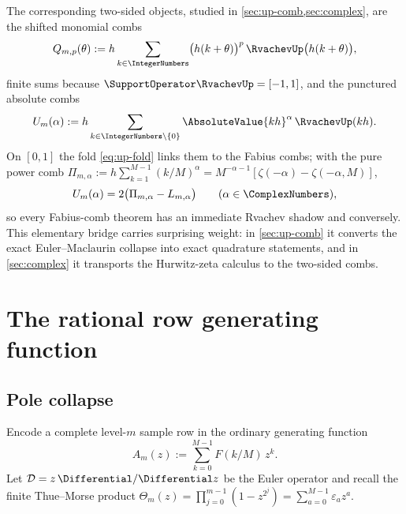 \documentclass[11pt,oneside]{article}
\numberwithin{equation}{section}
\theoremstyle{definition}
\theoremstyle{remark}
\newcommand{\eps}{\varepsilon}
\newcommand{\Dop}{\mathcal D}
\newcommand{\ThetaTM}{\Theta}
\begin{document}
The corresponding two-sided objects, studied in
\cref{sec:up-comb,sec:complex}, are the shifted monomial combs
\begin{equation}
 Q_{m,p}(\theta)
 :=h\sum_{k\in\IntegerNumbers}\bigl(h(k+\theta)\bigr)^{p}\,
 \RvachevUp\bigl(h(k+\theta)\bigr),
 \label{eq:Qmp}
\end{equation}
finite sums because $\SupportOperator\RvachevUp=[-1,1]$, and the punctured absolute combs
\begin{equation}
 U_m(\alpha)
 :=h\sum_{k\in\IntegerNumbers\setminus\{0\}}\AbsoluteValue{kh}^{\alpha}\,\RvachevUp(kh).
 \label{eq:A-alpha-def}
\end{equation}
On $[0,1]$ the fold \eqref{eq:up-fold} links them to the Fabius combs;
with the pure power comb
$\Pi_{m,\alpha}:=h\sum_{k=1}^{M-1}(k/M)^{\alpha}
=M^{-\alpha-1}[\zeta(-\alpha)-\zeta(-\alpha,M)]$,
\begin{equation}
 U_m(\alpha)=2\bigl(\Pi_{m,\alpha}-L_{m,\alpha}\bigr)
 \qquad(\alpha\in\ComplexNumbers),
 \label{eq:U-relation}
\end{equation}
so every Fabius-comb theorem has an immediate Rvachev shadow and
conversely.  This elementary bridge carries surprising weight: in
\cref{sec:up-comb} it converts the exact Euler--Maclaurin collapse into
exact quadrature statements, and in \cref{sec:complex} it transports
the Hurwitz-zeta calculus to the two-sided combs.

\section{The rational row generating function}
\label{sec:row}

\subsection{Pole collapse}

Encode a complete level-$m$ sample row in the ordinary generating
function
\begin{equation}
 A_m(z):=\sum_{k=0}^{M-1}F(k/M)\,z^{k}.
 \label{eq:AN}
\end{equation}
Let $\Dop=z\,\Differential/\Differential z$ be the Euler operator and recall the finite
Thue--Morse product
$\ThetaTM_m(z)=\prod_{j=0}^{m-1}(1-z^{2^{j}})
=\sum_{a=0}^{M-1}\eps_a z^{a}$.
\end{document}

